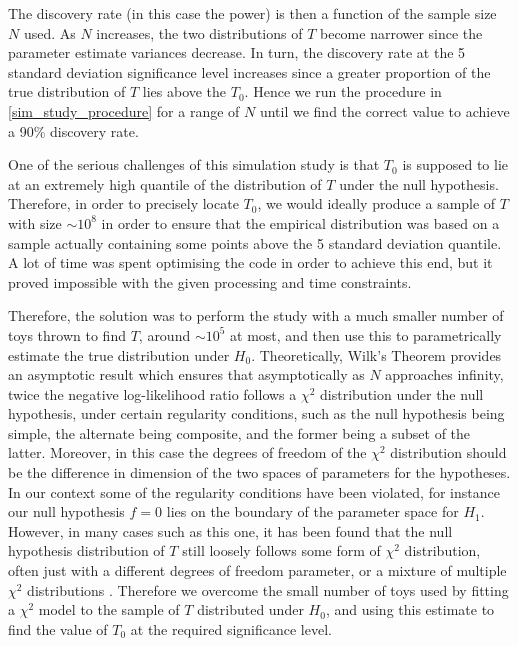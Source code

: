 \documentclass[12pt]{article}
\begin{document}
The discovery rate (in this case the power) is then a function of the sample size $N$ used.
As $N$ increases, the two distributions of $T$ become narrower since the parameter estimate variances decrease.
In turn, the discovery rate at the 5 standard deviation significance level increases since a greater proportion of the true distribution of $T$ lies above the $T_0$.
Hence we run the procedure in \ref{sim_study_procedure} for a range of $N$ until we find the correct value to achieve a 90\% discovery rate.

One of the serious challenges of this simulation study is that $T_0$ is supposed to lie at an extremely high quantile of the distribution of $T$ under the null hypothesis.
Therefore, in order to precisely locate $T_0$, we would ideally produce a sample of $T$ with size $\sim10^8$ in order to ensure that the empirical distribution was based on a sample actually containing some points above the 5 standard deviation quantile.
A lot of time was spent optimising the code in order to achieve this end, but it proved impossible with the given processing and time constraints.

Therefore, the solution was to perform the study with a much smaller number of toys thrown to find $T$, around $\sim10^5$ at most, and then use this to parametrically estimate the true distribution under $H_0$.
Theoretically, Wilk's Theorem \cite{wilks} provides an asymptotic result which ensures that asymptotically as $N$ approaches infinity, twice the negative log-likelihood ratio follows a $\chi^2$ distribution under the null hypothesis, under certain regularity conditions, such as the null hypothesis being simple, the alternate being composite, and the former being a subset of the latter.
Moreover, in this case the degrees of freedom of the $\chi^2$ distribution should be the difference in dimension of the two spaces of parameters for the hypotheses.
In our context some of the regularity conditions have been violated, for instance our null hypothesis $f=0$ lies on the boundary of the parameter space for $H_1$.
However, in many cases such as this one, it has been found that the null hypothesis distribution of $T$ still loosely follows some form of $\chi^2$ distribution, often just with a different degrees of freedom parameter, or a mixture of multiple $\chi^2$ distributions \cite{wilks_exc_1} \cite{wilks_exc_2}.
Therefore we overcome the small number of toys used by fitting a $\chi^2$ model to the sample of $T$ distributed under $H_0$, and using this estimate to find the value of $T_0$ at the required significance level.
\end{document}
